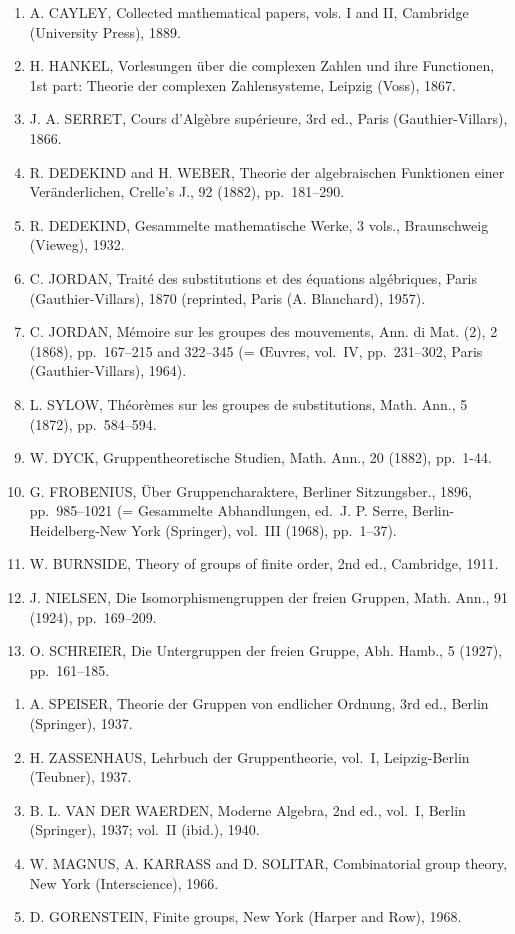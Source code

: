 \begin{enumerate}
\def\labelenumi{\arabic{enumi}.}
\setcounter{enumi}{9}
\item
  A. CAYLEY, Collected mathematical papers, vols. I and II, Cambridge (University Press), 1889.
\item
  H. HANKEL, Vorlesungen über die complexen Zahlen und ihre Functionen, 1st part: Theorie der complexen Zahlensysteme, Leipzig (Voss), 1867.
\item
  J. A. SERRET, Cours d'Algèbre supérieure, 3rd ed., Paris (Gauthier-Villars), 1866.
\item
  R. DEDEKIND and H. WEBER, Theorie der algebraischen Funktionen einer Veränderlichen, Crelle's J., 92 (1882), pp.~181--290.
\item
  R. DEDEKIND, Gesammelte mathematische Werke, 3 vols., Braunschweig (Vieweg), 1932.
\item
  C. JORDAN, Traité des substitutions et des équations algébriques, Paris (Gauthier-Villars), 1870 (reprinted, Paris (A. Blanchard), 1957).
\item
  C. JORDAN, Mémoire sur les groupes des mouvements, Ann. di Mat. (2), 2 (1868), pp.~167--215 and 322--345 (= Œuvres, vol.~IV, pp.~231--302, Paris (Gauthier-Villars), 1964).
\item
  L. SYLOW, Théorèmes sur les groupes de substitutions, Math. Ann., 5 (1872), pp.~584--594.
\item
  W. DYCK, Gruppentheoretische Studien, Math. Ann., 20 (1882), pp.~1-44.
\item
  G. FROBENIUS, Über Gruppencharaktere, Berliner Sitzungsber., 1896, pp.~985--1021 (= Gesammelte Abhandlungen, ed.~J. P. Serre, Berlin-Heidelberg-New York (Springer), vol.~III (1968), pp.~1--37).
\item
  W. BURNSIDE, Theory of groups of finite order, 2nd ed., Cambridge, 1911.
\item
  J. NIELSEN, Die Isomorphismengruppen der freien Gruppen, Math. Ann., 91 (1924), pp.~169--209.
\item
  O. SCHREIER, Die Untergruppen der freien Gruppe, Abh. Hamb., 5 (1927), pp.~161--185.
\end{enumerate}

\begin{enumerate}
\def\labelenumi{\arabic{enumi}.}
\setcounter{enumi}{22}
\item
  A. SPEISER, Theorie der Gruppen von endlicher Ordnung, 3rd ed., Berlin (Springer), 1937.
\item
  H. ZASSENHAUS, Lehrbuch der Gruppentheorie, vol.~I, Leipzig-Berlin (Teubner), 1937.
\item
  B. L. VAN DER WAERDEN, Moderne Algebra, 2nd ed., vol.~I, Berlin (Springer), 1937; vol.~II (ibid.), 1940.
\item
  W. MAGNUS, A. KARRASS and D. SOLITAR, Combinatorial group theory, New York (Interscience), 1966.
\item
  D. GORENSTEIN, Finite groups, New York (Harper and Row), 1968.
\end{enumerate}

